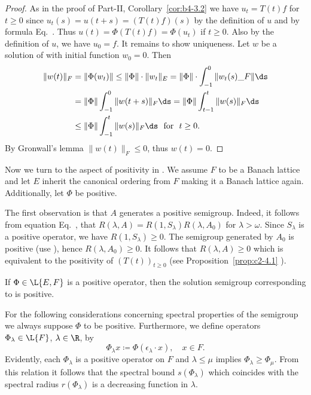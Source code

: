 \begin{proof}
As in the proof of Part-II, Corollary~\ref{cor:b4-3.2} we have $u_t = T(t)f$ for $t \geq 0$ since $u_t(s) = u(t+s) = (T(t)f)(s)$ by the definition of\/ $u$ and by formula Eq.~.
Thus $u(t) = \Phi(T(t)f) = \Phi(u_t)$ if\/ $t \geq 0$.
Also by the definition of\/ $u$, we have $u_{0} = f$.
It remains to show uniqueness.
Let $w$ be a solution of  with initial function $w_{0} = 0$.
Then
\begin{align*}
\|w(t)\|_F & = \|\Phi(w_{t})\| \leq \|\Phi\| \cdot  \|w_{t}\|_{E} =  \|\Phi\| \cdot \int_{-1}^{0} \|w_{t}(s)\_{F}\| \ds \\
&=  \|\Phi\| \int_{-1}^0 \|w(t+s)\|_{F} \ds = \|\Phi\| \int_{t-1}^{t} \|w(s)\|_{F} \ds \\
&\leq \|\Phi\| \int_{-1}^{t} \|w(s)\|_{F} \ds \ \text{ for } \ t \geq 0 .
\end{align*}
By Gronwall's lemma $\|w(t)\|_F \leq 0$, thus $w(t) = 0$.
\end{proof}
Now we turn to the aspect of positivity in . We assume $F$ to be a Banach lattice and let $E$ inherit the canonical ordering from $F$ making it a Banach lattice again. Additionally, let $\Phi$ be positive.

The first observation is that $A$ generates a positive semigroup.
Indeed, it follows from equation Eq.~, that $R(\lambda,A) = R(1,S_\lambda)R(\lambda,A_{0})$ for $\lambda > \omega$. Since $S_\lambda$ is a positive operator, we have $R(1,S_\lambda) \geq 0$.
The semigroup generated by $A_{0}$ is positive (use ), hence $R(\lambda,A_{0}) \geq 0$.
It follows that $R(\lambda,A) \geq 0$ which is equivalent to the positivity of\/ $(T(t))_{t \geq 0}$ (see Proposition~\ref{prop:c2-4.1} ).
\begin{proposition}\label{prop:c4-3.3}
If\/ $\Phi \in \L{E,F}$ is a positive operator, then the solution semigroup corresponding to  is positive.
\end{proposition}
For the following considerations concerning spectral properties of the semigroup we always suppose $\Phi$ to be positive. Furthermore, we define operators $\Phi_{\lambda} \in \L{F}$, $\lambda \in \R$, by
\begin{equation}\label{eq:c4-3.6}
\Phi_\lambda x \coloneq \Phi(\epsilon_{\lambda} \cdot x), \quad x \in F .
\end{equation}
Evidently, each $\Phi_\lambda$ is a positive operator on $F$ and $\lambda \leq \mu$ implies $\Phi_{\lambda} \geq \Phi_{\mu}$.
From this relation it follows that the spectral bound $s(\Phi_{\lambda})$ which coincides with the spectral radius $r(\Phi_{\lambda})$ is a decreasing function in $\lambda$.

